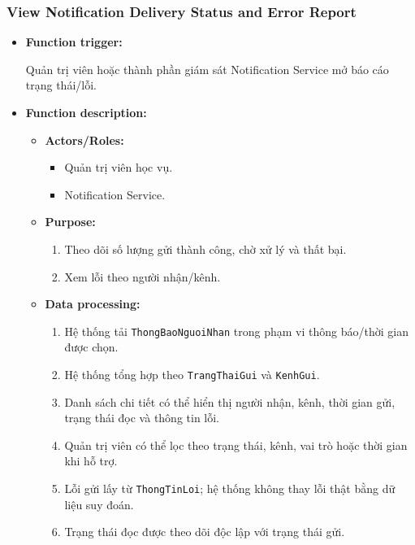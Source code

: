 \documentclass[12pt,a4paper,oneside]{report}
\begin{document}
\subsubsection{View Notification Delivery Status and Error Report}
\label{subsubsec:view-notification-delivery-status}

\begin{itemize}

    \item \textbf{Function trigger:}

    Quản trị viên hoặc thành phần giám sát Notification Service mở báo cáo trạng thái/lỗi.

    \item \textbf{Function description:}

    \begin{itemize}

        \item \textbf{Actors/Roles:}
        \begin{itemize}
            \item Quản trị viên học vụ.
            \item Notification Service.
        \end{itemize}

        \item \textbf{Purpose:}
        \begin{enumerate}
            \item Theo dõi số lượng gửi thành công, chờ xử lý và thất bại.
            \item Xem lỗi theo người nhận/kênh.
        \end{enumerate}

        \item \textbf{Data processing:}
        \begin{enumerate}
            \item Hệ thống tải \texttt{ThongBaoNguoiNhan} trong phạm vi thông báo/thời gian được chọn.
            \item Hệ thống tổng hợp theo \texttt{TrangThaiGui} và \texttt{KenhGui}.
            \item Danh sách chi tiết có thể hiển thị người nhận, kênh, thời gian gửi, trạng thái đọc và thông tin lỗi.
            \item Quản trị viên có thể lọc theo trạng thái, kênh, vai trò hoặc thời gian khi hỗ trợ.
            \item Lỗi gửi lấy từ \texttt{ThongTinLoi}; hệ thống không thay lỗi thật bằng dữ liệu suy đoán.
            \item Trạng thái đọc được theo dõi độc lập với trạng thái gửi.
        \end{enumerate}


\end{itemize}
\end{itemize}
\end{document}
